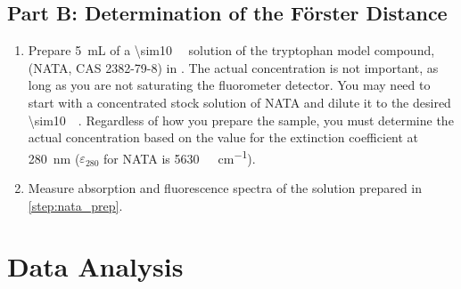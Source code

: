 \documentclass[nobib,nofonts,nols,nohyper]{tufte-handout}
\begin{document}

\subsection{Part B: Determination of the Förster Distance} %
\label{sub:part_b_determination_of_the_forster_distance}

\begin{enumerate}
	\item Prepare \qty{5}{\mL} of a \qty{\sim10}{\micro\Molar} solution of the tryptophan model compound,  (NATA, CAS 2382-79-8) in . 
	The actual concentration is not important, as long as you are not saturating the fluorometer detector. 
	You may need to start with a concentrated stock solution of NATA and dilute it to the desired \qty{\sim10}{\micro\Molar}. 
	Regardless of how you prepare the sample, you must determine the actual concentration based on the value for the extinction coefficient at \qty{280}{\nm} (\( \varepsilon_{280} \) for NATA is \qty{5630}{\per\Molar\per\cm}).
	\label{step:nata_prep}
	\item Measure absorption and fluorescence spectra of the solution prepared in \cref{step:nata_prep}.
	\label{step:nata_spectrum} 
\end{enumerate}


\section{Data Analysis} %
\label{sec:data_analysis}
\end{document}

